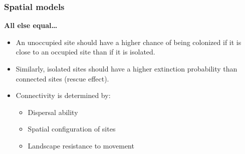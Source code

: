\documentclass[color=usenames,dvipsnames]{beamer}\usepackage[]{graphicx}\usepackage[]{xcolor}
\begin{document}
\begin{frame}
  \frametitle{Spatial models}
  \large
  {\bf All else equal\dots}
  \begin{itemize}%
    \item An unoccupied site should have a higher chance of being
      colonized if it is close to an occupied site than if it is isolated. 
    \item<2-> Similarly, isolated sites should have a higher extinction
      probability than connected sites (rescue effect).
    \item<3-> Connectivity is determined by:
      \begin{itemize}
        \large
        \item<4-> Dispersal ability
        \item<4-> Spatial configuration of sites
        \item<4-> Landscape resistance to movement
      \end{itemize}
  \end{itemize}
\end{frame}



\end{document}
